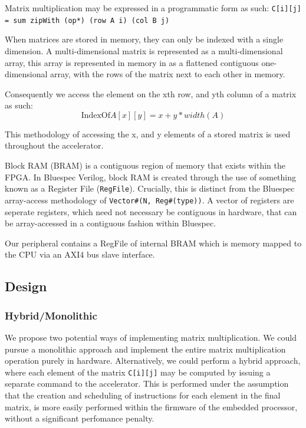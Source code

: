 \documentclass[a4paper,8pt]{report}
\begin{document}
Matrix multiplication may be expressed in a programmatic form as such:
\texttt{C[i][j] = sum zipWith (op*) (row A i) (col B j)}

When matrices are stored in memory, they can only be indexed with a single
dimension. A multi-dimensional matrix is represented as a multi-dimensional
array, this array is represented in memory in as a flattened contiguous
one-dimensional array, with the rows of the matrix next to each other in memory.

Consequently we access the element on the xth row, and yth column of a matrix as
such:
$$ \text{IndexOf} A[x][y] = x + y * width(A) $$

This methodology of accessing the x, and y elements of a stored matrix is used
throughout the accelerator.

Block RAM (BRAM) is a contiguous region of memory that exists within the FPGA. In
Bluespec Verilog, block RAM is created through the use of something known as a
Register File (\texttt{RegFile}). Crucially, this is distinct from the Bluespec
array-access methodology of \texttt{Vector\#(N, Reg\#(type))}. A vector of
registers are seperate registers, which need not necessary be contiguous in
hardware, that can be array-accessed in a contiguous fashion within Bluespec.

Our peripheral contains a RegFile of internal BRAM which is memory mapped to
the CPU via an AXI4 bus slave interface. 

\subsection{Design}
\subsubsection{Hybrid/Monolithic}
We propose two potential ways of implementing matrix multiplication. We could
pursue a monolithic approach and implement the entire matrix multiplication
operation purely in hardware. Alternatively, we could perform a hybrid approach,
where each element of the matrix \texttt{C[i][j]} may be computed by issuing a
separate command to the accelerator. This is performed under the assumption that the
creation and scheduling of instructions for each element in the final matrix, is
more easily performed within the firmware of the embedded processor, without a
significant perfomance penalty.
\end{document}
